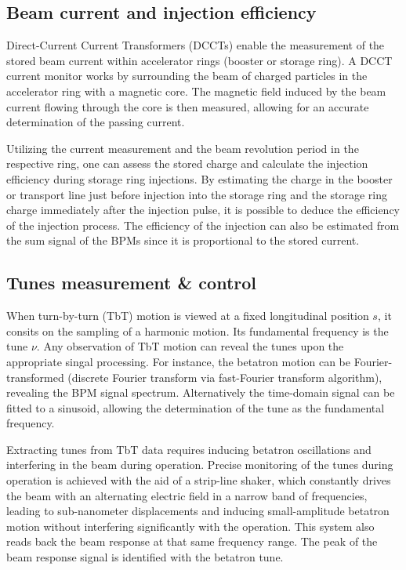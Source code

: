 \subsection{Beam current and injection efficiency}
Direct-Current Current Transformers (DCCTs) enable the measurement of the stored beam current within accelerator rings (booster or storage ring). A DCCT current monitor works by surrounding the beam of charged particles in the accelerator ring with a magnetic core. The magnetic field induced by the beam current flowing through the core is then measured, allowing for an accurate determination of the passing current.

Utilizing the current measurement and the beam revolution period in the respective ring, one can assess the stored charge and calculate the injection efficiency during storage ring injections. By estimating the charge in the booster or transport line just before injection into the storage ring and the storage ring charge immediately after the injection pulse, it is possible to deduce the efficiency of the injection process. The efficiency of the injection can also be estimated from the sum signal of the BPMs since it is proportional to the stored current.

\subsection{Tunes measurement \& control}
When turn-by-turn (TbT) motion is viewed at a fixed longitudinal position $s$, it consits on the sampling of a harmonic motion. Its fundamental frequency is the tune $\nu$. Any observation of TbT motion can reveal the tunes upon the appropriate singal processing. For instance, the betatron motion can be Fourier-transformed (discrete Fourier transform via fast-Fourier transform algorithm), revealing the BPM signal spectrum. Alternatively the time-domain signal can be fitted to a sinusoid, allowing the determination of the tune as the fundamental frequency.

Extracting tunes from TbT data requires inducing betatron oscillations and interfering in the beam during operation. Precise  monitoring of the tunes during operation is achieved with the aid of a strip-line shaker, which constantly drives the beam with an alternating electric field in a narrow band of frequencies, leading to sub-nanometer displacements and inducing small-amplitude betatron motion without interfering significantly with the operation. This system also reads back the beam response at that same frequency range. The peak of the beam response signal is identified with the betatron tune.


